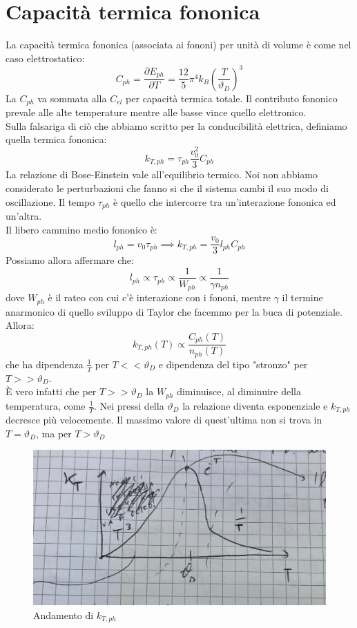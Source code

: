 \documentclass{book}
\begin{document}
    \section{Capacità termica fononica}
        La capacità termica fononica (associata ai fononi) per unità di volume è come nel caso elettrostatico:
        $$C_{ph} = \frac{\partial E_{ph}}{\partial T} = \frac{12}{5}\pi ^{4}k_{B}(\frac{T}{\vartheta_{D}})^{3}$$
        La $C_{ph}$ va sommata alla $C_{el}$ per capacità termica totale. Il contributo fononico prevale alle alte temperature mentre alle basse vince quello elettronico.\\
        Sulla falsariga di ciò che abbiamo scritto per la conducibilità elettrica, definiamo quella termica fononica:
        $$k_{T, ph} = \tau_{ph} \frac{v_{0} ^{2}}{3}C_{ph}$$
        La relazione di Bose-Einstein vale all'equilibrio termico. Noi non abbiamo considerato le perturbazioni che fanno si che il sistema cambi il suo modo di oscillazione. Il tempo $\tau_{ph}$ è quello che intercorre tra un'interazione fononica ed un'altra.\\
        Il libero cammino medio fononico è:
        $$l_{ph} = v_{0} \tau_{ph} \implies k_{T,ph} = \frac{v_{0}}{3}l_{ph}C_{ph}$$
        Possiamo allora affermare che:
        $$l_{ph} \propto \tau_{ph} \propto \frac{1}{W_{ph}} \propto \frac{1}{\gamma n_{ph}}$$
        dove $W_{ph}$ è il rateo con cui c'è interazione con i fononi, mentre $\gamma$ il termine anarmonico di quello sviluppo di Taylor che facemmo per la buca di potenziale.\\
        Allora:
        $$k_{T, ph} (T) \propto \frac{C_{ph}(T)}{n_{ph}(T)}$$
        che ha dipendenza $\displaystyle \frac{1}{T}$ per $T<< \vartheta_{D}$ e dipendenza del tipo "stronzo" per $T>> \vartheta_{D}$.\\
        È vero infatti che per $T>> \vartheta_{D}$ la $W_{ph}$ diminuisce, al diminuire della temperatura, come $\frac{1}{T}$. Nei pressi della $\vartheta_{D}$ la relazione diventa esponenziale e $k_{T, ph}$ decresce più velocemente. Il massimo valore di quest'ultima non si trova in $T=\vartheta_{D}$, ma per $T> \vartheta_{D}$
        \begin{figure}[h!]
            \centering
            \includegraphics[width=0.5\linewidth]{img/asset2.png}
            \caption{Andamento di $k_{T, ph}$}
        \end{figure}
\end{document}
